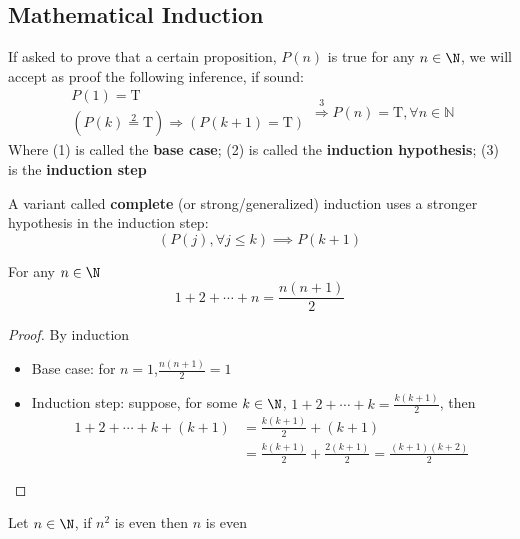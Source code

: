 \subsection{Mathematical Induction}
\begin{definition*}\label{def:mathematical-induction}
    If asked to prove that a certain proposition, $P(n)$ is true for any $n \in \N$, we will accept as proof the following inference, if sound:
    \begin{equation*}
        \begin{array}{c}
            P(1) = \text{T} \tag{1} \\
            \left(P(k) \stackrel{2}{=} \text{T}\right) \Rightarrow \left(P(k+1) = \text{T}\right)
        \end{array}
        \stackrel{3}{\Rightarrow} P(n) = \text{T}, \forall n \in \mathbb{N}
    \end{equation*}
    Where (1) is called the \textbf{base case}; (2) is called the \textbf{induction hypothesis}; (3) is the \textbf{induction step}
\end{definition*}
A variant called \textbf{complete} (or strong/generalized) induction uses a stronger hypothesis in the induction step:
\[
(P(j),\forall j \leq k) \implies P(k+1)
\]
\begin{proposition}
    For any $n \in \N$
    \[
    1+2+\cdots+n=\frac{n(n+1)}{2}
    \]
\end{proposition}
\begin{proof}
    By induction
    \begin{itemize}
        \item Base case: for $n=1$,$\frac{n(n+1)}{2}=1$
        \item Induction step: suppose, for some $k \in \N$, $1+2+\cdots+k=\frac{k(k+1)}{2}$, then
        \begin{align*}
        1+2+\cdots+k+(k+1)&=\frac{k(k+1)}{2}+(k+1) \\
        &=\frac{k(k+1)}{2}+\frac{2(k+1)}{2}=\frac{(k+1)(k+2)}{2}
        \end{align*}
    \end{itemize}
\end{proof}
\begin{proposition}
    Let $n \in \N$, if $n^2$ is even then $n$ is even
\end{proposition}
